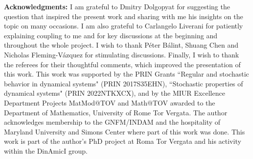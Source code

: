 \documentclass{amsart}
\numberwithin{equation}{section}
\begin{document}
\textbf{Acknowledgments:} I am grateful to Dmitry Dolgopyat for suggesting the question that inspired the present work and sharing with me his insights on the topic on many occasions. I am also grateful to Carlangelo Liverani for patiently explaining coupling to me and for key discussions at the beginning and throughout the whole project. I wish to thank P\'eter B\'alint, Shuang Chen and Nicholas Fleming-Vázquez for stimulating discussions. Finally, I wish to thank the referees for their thoughtful comments, which improved the presentation of this work. This work was supported by the PRIN Grants ``Regular and stochastic behavior in dynamical systems" (PRIN 2017S35EHN), ``Stochastic properties of dynamical systems" (PRIN 2022NTKXCX), and by the MIUR Excellence Department Projects MatMod@TOV and Math@TOV awarded to the Department of Mathematics, University of Rome Tor Vergata. The author acknowledges membership to the GNFM/INDAM and the hospitality of Maryland University and Simons Center where part of this work was done. This work is part of the author's PhD project at Roma Tor Vergata and his activity within the DinAmicI group.
\end{document}
